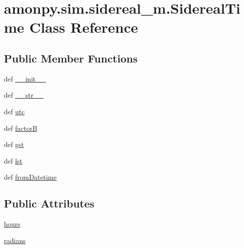 \hypertarget{classamonpy_1_1sim_1_1sidereal__m_1_1_sidereal_time}{\section{amonpy.\-sim.\-sidereal\-\_\-m.\-Sidereal\-Time Class Reference}
\label{classamonpy_1_1sim_1_1sidereal__m_1_1_sidereal_time}
}
\subsection*{Public Member Functions}
\begin{DoxyCompactItemize}
\item 
def \hyperlink{classamonpy_1_1sim_1_1sidereal__m_1_1_sidereal_time_ac7749fef1e37f6581bdef77f96b3171e}{\-\_\-\-\_\-init\-\_\-\-\_\-}
\item 
def \hyperlink{classamonpy_1_1sim_1_1sidereal__m_1_1_sidereal_time_aeef84231ce9c3b15c14043bf2acd1da8}{\-\_\-\-\_\-str\-\_\-\-\_\-}
\item 
def \hyperlink{classamonpy_1_1sim_1_1sidereal__m_1_1_sidereal_time_a197d891ad85ed8452f10c06875a8c905}{utc}
\item 
def \hyperlink{classamonpy_1_1sim_1_1sidereal__m_1_1_sidereal_time_a1c5412f21f639b78f0b003434abe6abc}{factor\-B}
\item 
def \hyperlink{classamonpy_1_1sim_1_1sidereal__m_1_1_sidereal_time_a15a762c9492c12fd401647e5a19283fd}{gst}
\item 
def \hyperlink{classamonpy_1_1sim_1_1sidereal__m_1_1_sidereal_time_a011e7f340e809148497ca5c6f1742f60}{lst}
\item 
def \hyperlink{classamonpy_1_1sim_1_1sidereal__m_1_1_sidereal_time_ad2b5324d374369d2b0588bb1d3eb30a6}{from\-Datetime}
\end{DoxyCompactItemize}
\subsection*{Public Attributes}
\begin{DoxyCompactItemize}
\item 
\hyperlink{classamonpy_1_1sim_1_1sidereal__m_1_1_sidereal_time_acba5be2a2c0a308b30ea3f58109c40d7}{hours}
\item 
\hyperlink{classamonpy_1_1sim_1_1sidereal__m_1_1_sidereal_time_a7c0b958d0efa0333b2fc200246d54208}{radians}
\end{DoxyCompactItemize}

